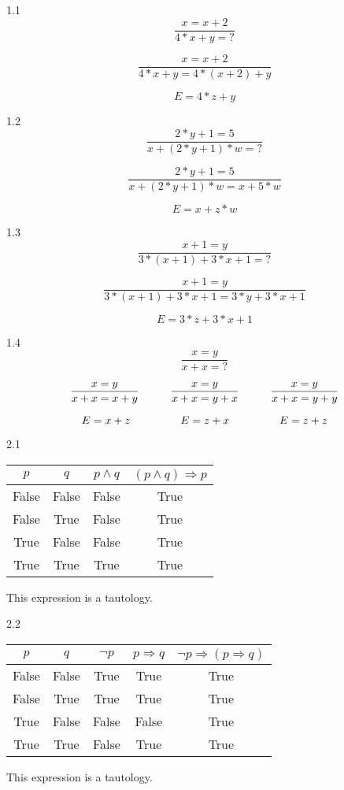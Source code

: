 \documentclass{article}
\begin{document}


1.1
\[ \frac{x = x + 2}{4 * x + y = \mathord{?}} \]

\[ \frac{x = x + 2}{4 * x + y = 4 * (x + 2) + y} \]

\[ E = 4 * z + y \]

\vspace{10mm}
1.2
\[ \frac{2 * y + 1 = 5}{x + (2 * y + 1) * w = \mathord{?}} \]

\[ \frac{2 * y + 1 = 5}{x + (2 * y + 1) * w = x + 5 * w} \]

\[ E = x + z * w \]

\vspace{10mm}
1.3
\[ \frac{x + 1 = y}{3 * (x + 1) + 3 * x + 1 = \mathord{?}} \]

\[ \frac{x + 1 = y}{3 * (x + 1) + 3 * x + 1 = 3 * y + 3 * x + 1} \]

\[ E = 3 * z + 3 * x + 1 \]

\vspace{10mm}
1.4
\[ \frac{x = y}{x + x = \mathord{?}} \]

\[ 
    \frac{x = y}{x + x = x + y} \hspace{10mm} 
    \frac{x = y}{x + x = y + x} \hspace{10mm} 
    \frac{x = y}{x + x = y + y}
\]

\[
    E = x + z \hspace{16mm}
    E = z + x \hspace{16mm}
    E = z + z
\]

\newpage

2.1
\begin{center}
    \begin{tabular}{c c|c||c}
         $p$ & $q$ & \( p \land q \) & \( (p \land q) \Longrightarrow p\) \\
         \hline
         False & False & False & True \\
         False & True & False & True \\
         True & False & False & True \\
         True & True & True & True \\
    \end{tabular}
    This expression is a tautology.
\end{center}

2.2
\begin{center}
    \begin{tabular}{c c|c|c||c}
         $p$ & $q$ & \( \neg p \) & \( p \Longrightarrow q \) & \( \neg p \Longrightarrow (p \Longrightarrow q) \) \\
         \hline
         False & False & True & True & True \\
         False & True & True & True & True \\
         True & False & False & False & True \\
         True & True & False & True & True \\
    \end{tabular}
\end{center}
\begin{center} This expression is a tautology. \end{center}
\end{document}
